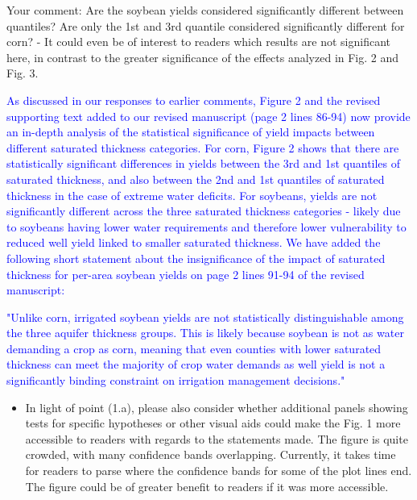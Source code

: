 \documentclass[
]{article}
\providecommand{\tightlist}{%
  \setlength{\itemsep}{0pt}\setlength{\parskip}{0pt}}
\begin{document}
Your comment: Are the soybean yields considered significantly different
between quantiles? Are only the 1st and 3rd quantile considered
significantly different for corn? - It could even be of interest to
readers which results are not significant here, in contrast to the
greater significance of the effects analyzed in Fig. 2 and Fig. 3.

\textcolor{blue}{As discussed in our responses to earlier comments, Figure 2 and the revised supporting text added to our revised manuscript (page 2 lines 86-94) now provide an in-depth analysis of the statistical significance of yield impacts between different saturated thickness categories. For corn, Figure 2 shows that there are statistically significant differences in yields between the 3rd and 1st quantiles of saturated thickness, and also between the 2nd and 1st quantiles of saturated thickness in the case of extreme water deficits. For soybeans, yields are not significantly different across the three saturated thickness categories - likely due to soybeans having lower water requirements and therefore lower vulnerability to reduced well yield linked to smaller saturated thickness. We have added the following short statement about the insignificance of the impact of saturated thickness for per-area soybean yields on page 2 lines 91-94 of the revised manuscript:}

\textcolor{blue}{"Unlike corn, irrigated soybean yields are not statistically distinguishable among the three aquifer thickness groups. This is likely because soybean is not as water demanding a crop as corn, meaning that even counties with lower saturated thickness can meet the majority of crop water demands as well yield is not a significantly binding constraint on irrigation management decisions."}

\begin{itemize}
\tightlist
\item
  In light of point (1.a), please also consider whether additional
  panels showing tests for specific hypotheses or other visual aids
  could make the Fig. 1 more accessible to readers with regards to the
  statements made. The figure is quite crowded, with many confidence
  bands overlapping. Currently, it takes time for readers to parse where
  the confidence bands for some of the plot lines end. The figure could
  be of greater benefit to readers if it was more accessible.
\end{itemize}
\end{document}
